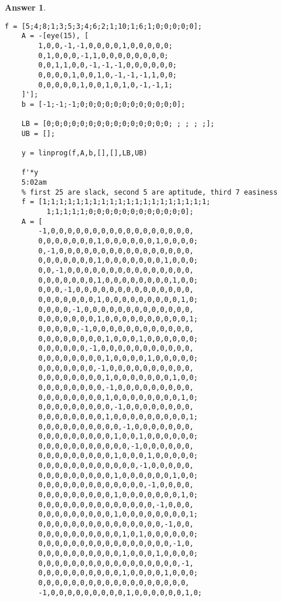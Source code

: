 \documentclass[12pt]{article}
\theoremstyle{colon}
\newtheorem*{answer}{Answer}
\begin{document}
\begin{answer}
  \begin{lstlisting}[style=Matlab-editor, basicstyle=\scriptsize]
    f = [5;4;8;1;3;5;3;4;6;2;1;10;1;6;1;0;0;0;0;0];
    A = -[eye(15), [
        1,0,0,-1,-1,0,0,0,0,1,0,0,0,0,0;
        0,1,0,0,0,-1,1,0,0,0,0,0,0,0,0;
        0,0,1,1,0,0,-1,-1,-1,0,0,0,0,0,0;
        0,0,0,0,1,0,0,1,0,-1,-1,-1,1,0,0;
        0,0,0,0,0,1,0,0,1,0,1,0,-1,-1,1;
    ]'];
    b = [-1;-1;-1;0;0;0;0;0;0;0;0;0;0;0;0];

    LB = [0;0;0;0;0;0;0;0;0;0;0;0;0;0;0; ; ; ; ;];
    UB = [];

    y = linprog(f,A,b,[],[],LB,UB)

    f'*y
    5:02am
    % first 25 are slack, second 5 are aptitude, third 7 easiness
    f = [1;1;1;1;1;1;1;1;1;1;1;1;1;1;1;1;1;1;1;1;
          1;1;1;1;1;0;0;0;0;0;0;0;0;0;0;0;0];
    A = [
        -1,0,0,0,0,0,0,0,0,0,0,0,0,0,0,0,0,0,
        0,0,0,0,0,0,0,1,0,0,0,0,0,0,1,0,0,0,0;
        0,-1,0,0,0,0,0,0,0,0,0,0,0,0,0,0,0,0,
        0,0,0,0,0,0,0,1,0,0,0,0,0,0,0,1,0,0,0;
        0,0,-1,0,0,0,0,0,0,0,0,0,0,0,0,0,0,0,
        0,0,0,0,0,0,0,1,0,0,0,0,0,0,0,0,1,0,0;
        0,0,0,-1,0,0,0,0,0,0,0,0,0,0,0,0,0,0,
        0,0,0,0,0,0,0,1,0,0,0,0,0,0,0,0,0,1,0;
        0,0,0,0,-1,0,0,0,0,0,0,0,0,0,0,0,0,0,
        0,0,0,0,0,0,0,1,0,0,0,0,0,0,0,0,0,0,1;
        0,0,0,0,0,-1,0,0,0,0,0,0,0,0,0,0,0,0,
        0,0,0,0,0,0,0,0,1,0,0,0,1,0,0,0,0,0,0;
        0,0,0,0,0,0,-1,0,0,0,0,0,0,0,0,0,0,0,
        0,0,0,0,0,0,0,0,1,0,0,0,0,1,0,0,0,0,0;
        0,0,0,0,0,0,0,-1,0,0,0,0,0,0,0,0,0,0,
        0,0,0,0,0,0,0,0,1,0,0,0,0,0,0,0,1,0,0;
        0,0,0,0,0,0,0,0,-1,0,0,0,0,0,0,0,0,0,
        0,0,0,0,0,0,0,0,1,0,0,0,0,0,0,0,0,1,0;
        0,0,0,0,0,0,0,0,0,-1,0,0,0,0,0,0,0,0,
        0,0,0,0,0,0,0,0,1,0,0,0,0,0,0,0,0,0,1;
        0,0,0,0,0,0,0,0,0,0,-1,0,0,0,0,0,0,0,
        0,0,0,0,0,0,0,0,0,1,0,0,1,0,0,0,0,0,0;
        0,0,0,0,0,0,0,0,0,0,0,-1,0,0,0,0,0,0,
        0,0,0,0,0,0,0,0,0,1,0,0,0,1,0,0,0,0,0;
        0,0,0,0,0,0,0,0,0,0,0,0,-1,0,0,0,0,0,
        0,0,0,0,0,0,0,0,0,1,0,0,0,0,0,0,1,0,0;
        0,0,0,0,0,0,0,0,0,0,0,0,0,-1,0,0,0,0,
        0,0,0,0,0,0,0,0,0,1,0,0,0,0,0,0,0,1,0;
        0,0,0,0,0,0,0,0,0,0,0,0,0,0,-1,0,0,0,
        0,0,0,0,0,0,0,0,0,1,0,0,0,0,0,0,0,0,1;
        0,0,0,0,0,0,0,0,0,0,0,0,0,0,0,-1,0,0,
        0,0,0,0,0,0,0,0,0,0,1,0,1,0,0,0,0,0,0;
        0,0,0,0,0,0,0,0,0,0,0,0,0,0,0,0,-1,0,
        0,0,0,0,0,0,0,0,0,0,1,0,0,0,1,0,0,0,0;
        0,0,0,0,0,0,0,0,0,0,0,0,0,0,0,0,0,-1,
        0,0,0,0,0,0,0,0,0,0,1,0,0,0,0,1,0,0,0;
        0,0,0,0,0,0,0,0,0,0,0,0,0,0,0,0,0,0,
        -1,0,0,0,0,0,0,0,0,0,1,0,0,0,0,0,0,1,0;

\end{lstlisting}
\end{answer}
\end{document}
